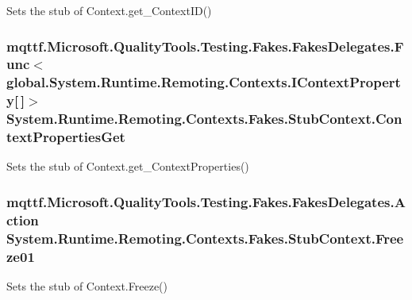 Sets the stub of Context.\-get\-\_\-\-Context\-I\-D()

\hypertarget{class_system_1_1_runtime_1_1_remoting_1_1_contexts_1_1_fakes_1_1_stub_context_a63cd05d27269a804e59e2c7a32327797}{
\subsubsection[{Context\-Properties\-Get}]{\setlength{\rightskip}{0pt plus 5cm}mqttf.\-Microsoft.\-Quality\-Tools.\-Testing.\-Fakes.\-Fakes\-Delegates.\-Func$<$global.\-System.\-Runtime.\-Remoting.\-Contexts.\-I\-Context\-Property\mbox{[}$\,$\mbox{]}$>$ System.\-Runtime.\-Remoting.\-Contexts.\-Fakes.\-Stub\-Context.\-Context\-Properties\-Get}}\label{class_system_1_1_runtime_1_1_remoting_1_1_contexts_1_1_fakes_1_1_stub_context_a63cd05d27269a804e59e2c7a32327797}


Sets the stub of Context.\-get\-\_\-\-Context\-Properties()

\hypertarget{class_system_1_1_runtime_1_1_remoting_1_1_contexts_1_1_fakes_1_1_stub_context_aa63812b1bc17fbfd86883e90fa9475e4}{
\subsubsection[{Freeze01}]{\setlength{\rightskip}{0pt plus 5cm}mqttf.\-Microsoft.\-Quality\-Tools.\-Testing.\-Fakes.\-Fakes\-Delegates.\-Action System.\-Runtime.\-Remoting.\-Contexts.\-Fakes.\-Stub\-Context.\-Freeze01}}\label{class_system_1_1_runtime_1_1_remoting_1_1_contexts_1_1_fakes_1_1_stub_context_aa63812b1bc17fbfd86883e90fa9475e4}


Sets the stub of Context.\-Freeze()

